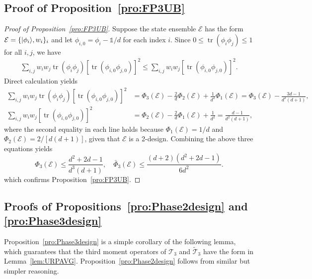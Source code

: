 \documentclass[aps,pra,twocolumn,nofootinbib,superscriptaddress,10pt]{revtex4-2}
\DeclarePairedDelimiter{\ket}{\lvert}{\rangle}
\DeclareMathOperator{\tr}{tr}
\newcommand{\bbone}{\mathds{1}}
\newcommand{\caE}{\mathcal{E}}
\newcommand{\caT}{\mathcal{T}}
\newcommand{\bPhi}{\bar{\Phi}}
\newcommand{\tcaT}{\tilde{\mathcal{T}}}
\newcommand{\lref}[1]{Lemma~\ref{#1}}
\newcommand{\pref}[1]{Proposition~\ref{#1}}
\newcommand{\Pref}[1]{Proposition~\ref{#1}}
\newcommand{\psref}[2]{Propositions~\ref{#1} and \ref{#2}}
\begin{document}
\subsection{Proof of \pref{pro:FP3UB}}
\begin{proof}[Proof of \pref{pro:FP3UB}]
Suppose the state ensemble $\caE$ has the form $\caE=\{\ket{\phi_i},w_i\}_i$ and let $\phi_{i,0}=\phi_i-\bbone/{d}$ for each index $i$. Since $0\leq \tr(\phi_i\phi_j)\leq 1$ for all $i,j$, we have
\begin{align}
\sum_{i,j}w_iw_j\tr(\phi_i\phi_j)\left[\tr\left(\phi_{i,0}\phi_{j,0}\right)\right]^2\le \sum_{i,j}w_iw_j\left[\tr\left(\phi_{i,0}\phi_{j,0}\right)\right]^2. \label{eq:phi_3_eq1}
\end{align}
Direct calculation yields
\begin{align}
\sum_{i,j}w_iw_j\tr(\phi_i\phi_j)\left[\tr\left(\phi_{i,0}\phi_{j,0}\right)\right]^2&=\Phi_3(\caE)-\frac{2}{d}\Phi_2(\caE)+\frac{1}{d^2}\Phi_1(\caE)=\Phi_3(\caE)-\frac{3d-1}{d^3(d+1)},\\
\sum_{i,j}w_iw_j\left[\tr\left(\phi_{i,0}\phi_{j,0}\right)\right]^2&=\Phi_2(\caE)-\frac{2}{d}\Phi_1(\caE)+\frac{1}{d^2}=\frac{d-1}{d^2(d+1)},
\end{align}
where the second equality in each line holds because $\Phi_1(\caE)=1/d$ and $\Phi_2(\caE)=2/[d(d+1)]$, given that $\caE$ is a 2-design. Combining the above three equations yields 
\begin{equation}
  \Phi_3(\caE)\leq  \frac{d^2+2d-1}{d^3(d+1)},\quad \bPhi_3(\caE)
		\leq \frac{(d+2)(d^2+2d-1)}{6d^2}. 
\end{equation}
which confirms
\pref{pro:FP3UB}.
\end{proof}

\subsection{Proofs of \psref{pro:Phase2design}{pro:Phase3design}}
\Pref{pro:Phase3design} is a simple corollary of the following lemma, which guarantees that the third moment operators of $\caT_3$ and $\tcaT_3$ have the form in \lref{lem:URPAVG}. \Pref{pro:Phase2design} follows from similar but simpler reasoning.
\end{document}
